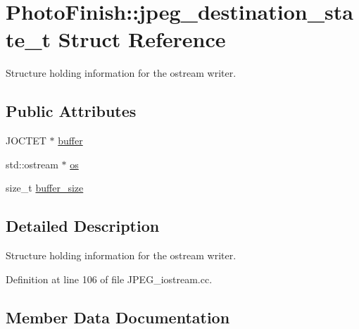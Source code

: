 \hypertarget{struct_photo_finish_1_1jpeg__destination__state__t}{}\section{Photo\+Finish\+:\+:jpeg\+\_\+destination\+\_\+state\+\_\+t Struct Reference}
\label{struct_photo_finish_1_1jpeg__destination__state__t}


Structure holding information for the ostream writer.  


\subsection*{Public Attributes}
\begin{DoxyCompactItemize}
\item 
J\+O\+C\+T\+ET $\ast$ \hyperlink{struct_photo_finish_1_1jpeg__destination__state__t_a7fb7ead4d786bd34daa0f0a6b98b011f}{buffer}
\item 
std\+::ostream $\ast$ \hyperlink{struct_photo_finish_1_1jpeg__destination__state__t_ae2bbb549f2d08fcd3f78c53e8f95646a}{os}
\item 
size\+\_\+t \hyperlink{struct_photo_finish_1_1jpeg__destination__state__t_a5882d9ced931f07986e3cdb875943d94}{buffer\+\_\+size}
\end{DoxyCompactItemize}


\subsection{Detailed Description}
Structure holding information for the ostream writer. 

Definition at line 106 of file J\+P\+E\+G\+\_\+iostream.\+cc.



\subsection{Member Data Documentation}
\mbox{\label{struct_photo_finish_1_1jpeg__destination__state__t_a7fb7ead4d786bd34daa0f0a6b98b011f}} 
